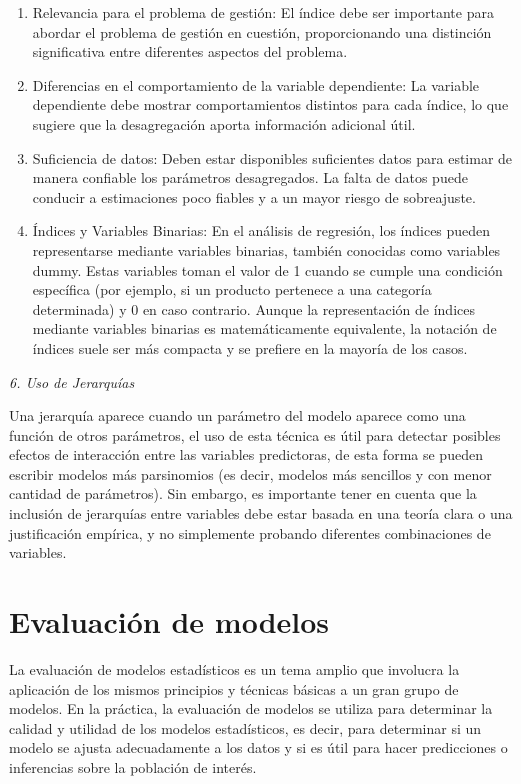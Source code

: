 \documentclass[
]{book}
\begin{document}
\begin{enumerate}
\def\labelenumi{\alph{enumi})}
\item
  Relevancia para el problema de gestión: El índice debe ser
  importante para abordar el problema de gestión en cuestión,
  proporcionando una distinción significativa entre diferentes
  aspectos del problema.
\item
  Diferencias en el comportamiento de la variable dependiente: La
  variable dependiente debe mostrar comportamientos distintos para
  cada índice, lo que sugiere que la desagregación aporta información
  adicional útil.
\item
  Suficiencia de datos: Deben estar disponibles suficientes datos para
  estimar de manera confiable los parámetros desagregados. La falta de
  datos puede conducir a estimaciones poco fiables y a un mayor riesgo
  de sobreajuste.
\item
  Índices y Variables Binarias: En el análisis de regresión, los
  índices pueden representarse mediante variables binarias, también
  conocidas como variables dummy. Estas variables toman el valor de 1
  cuando se cumple una condición específica (por ejemplo, si un
  producto pertenece a una categoría determinada) y 0 en caso
  contrario. Aunque la representación de índices mediante variables
  binarias es matemáticamente equivalente, la notación de índices
  suele ser más compacta y se prefiere en la mayoría de los casos.
\end{enumerate}

\emph{6. Uso de Jerarquías}

Una jerarquía aparece cuando un parámetro del modelo aparece como una
función de otros parámetros, el uso de esta técnica es útil para
detectar posibles efectos de interacción entre las variables
predictoras, de esta forma se pueden escribir modelos más parsinomios
(es decir, modelos más sencillos y con menor cantidad de parámetros).
Sin embargo, es importante tener en cuenta que la inclusión de
jerarquías entre variables debe estar basada en una teoría clara o una
justificación empírica, y no simplemente probando diferentes
combinaciones de variables.

\section{Evaluación de modelos}\label{evaluaciuxf3n-de-modelos-1}

La evaluación de modelos estadísticos es un tema amplio que involucra la
aplicación de los mismos principios y técnicas básicas a un gran grupo
de modelos. En la práctica, la evaluación de modelos se utiliza para
determinar la calidad y utilidad de los modelos estadísticos, es decir,
para determinar si un modelo se ajusta adecuadamente a los datos y si es
útil para hacer predicciones o inferencias sobre la población de
interés.
\end{document}
